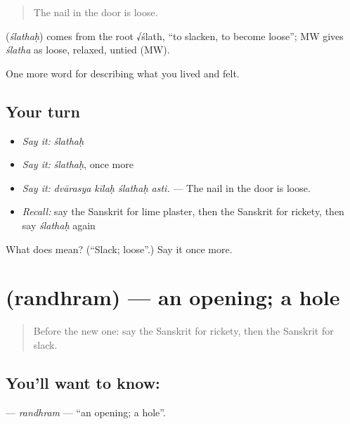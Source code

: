 \begin{quote}
The nail in the door is loose.
\end{quote}

\begin{cousinweb}
\textbf{} (\emph{ślathaḥ}) comes from the root √ślath, \textquotedblleft{}to slacken, to become loose\textquotedblright{}; MW gives \emph{ślatha} as loose, relaxed, untied (MW).
\end{cousinweb}

\begin{grammarlens}[title={What you've built}]
One more word for describing what you lived and felt.
\end{grammarlens}

\subsection*{Your turn}
\begin{itemize}
\raggedright
  \item \emph{Say it:} \emph{ślathaḥ}
  \item \emph{Say it:} \emph{ślathaḥ}, once more
  \item \emph{Say it:} \emph{dvārasya kīlaḥ ślathaḥ asti.} — The nail in the door is loose.
  \item \emph{Recall:} say the Sanskrit for lime plaster, then the Sanskrit for rickety, then say \emph{ślathaḥ} again
\end{itemize}

\begin{tcolorbox}[breakable,colback=teal!4,colframe=teal!35!black,title={Before you move on}]
What does  mean? (\textquotedblleft{}Slack; loose\textquotedblright{}.) Say it once more.
\end{tcolorbox}
\section[\texorpdfstring{\sk{रन्ध्रम्} (randhram)}{रन्ध्रम् (randhram)}]{ (randhram) — an opening; a hole}

\label{lesson:SA-C509-randhram}



\begin{quote}
Before the new one: say the Sanskrit for rickety, then the Sanskrit for slack.
\end{quote}

\subsection*{You'll want to know: }
\textbf{} — \emph{randhram} — \textquotedblleft{}an opening; a hole\textquotedblright{}.

